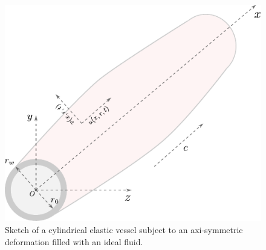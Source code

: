 \documentclass[alpha-refs, 12pt]{wiley-article}
\begin{document}
\begin{figure}
    \centering
    \includegraphics[width=0.55\linewidth]{sketch.pdf}
    \caption{Sketch of a cylindrical elastic vessel subject to an axi-symmetric deformation filled with an ideal fluid.}
    \label{fig:sketch3d}
\end{figure}
\end{document}
